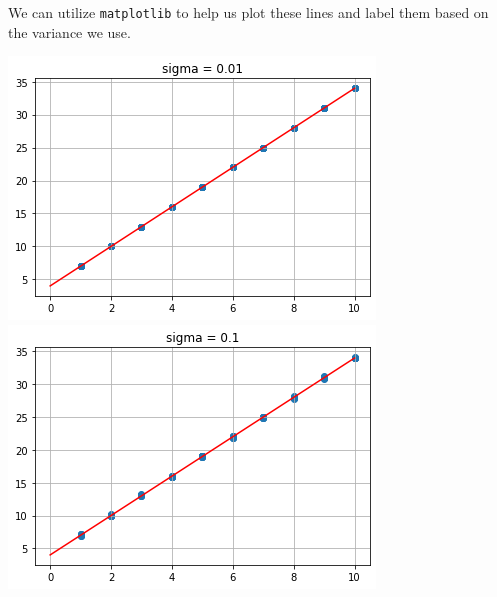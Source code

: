 \documentclass[11pt]{article}
\begin{document}
\begin{enumerate}
            We can utilize \texttt{matplotlib} to help us plot these lines and
            label them based on the variance we use.

            \begin{minipage}[t]{0.48\linewidth}
                \begin{center}
                    \includegraphics[width=\linewidth]{s.01.png}
                    \includegraphics[width=\linewidth]{s.1.png}
                \end{center}
            \end{minipage}\hfill\vline\hfill%
            \begin{minipage}[t]{0.48\linewidth}
                \begin{center}

\end{center}
\end{minipage}
\end{enumerate}
\end{document}
